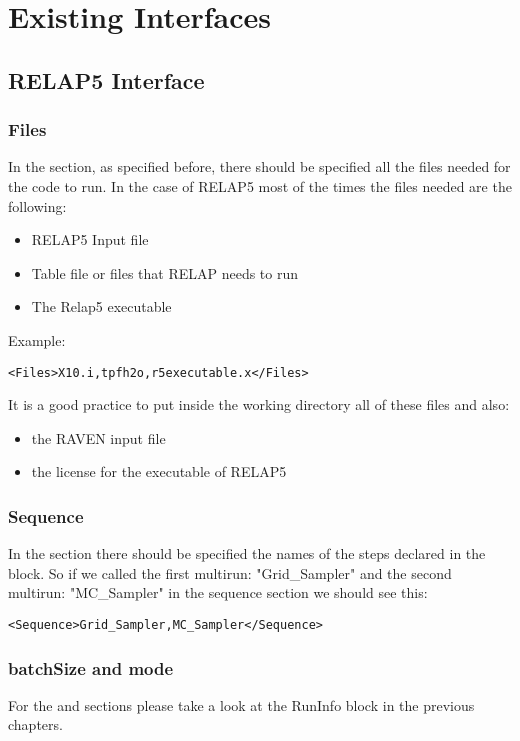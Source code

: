 \section{Existing Interfaces \\ \vspace{2 mm} {\small }}
\label{sec:existingInterface}
\subsection{RELAP5 Interface}

\subsubsection{Files}
In the  section, as specified before, there should be specified all the
files needed for the code to run.
%
In the case of RELAP5 most of the times the files needed are the following:
\begin{itemize}
  \item RELAP5 Input file
  \item Table file or files that RELAP needs to run
  \item The Relap5 executable
\end{itemize}
Example:
\begin{lstlisting}[style=XML]
<Files>X10.i,tpfh2o,r5executable.x</Files>
\end{lstlisting}

It is a good practice to put inside the working directory all of these files and
also:
\begin{itemize}
  \item the RAVEN input file
  \item the license for the executable of RELAP5
\end{itemize}
\subsubsection{Sequence}
In the  section there should be specified the names of the steps
declared in the  block.
%
So if we called the first multirun: "Grid\_Sampler" and the second multirun:
"MC\_Sampler" in the sequence section we should see this:
\begin{lstlisting}[style=XML]
<Sequence>Grid_Sampler,MC_Sampler</Sequence>
\end{lstlisting}
\subsubsection{batchSize and mode}
For the  and  sections please take a look at the RunInfo
block in the previous chapters.
%
